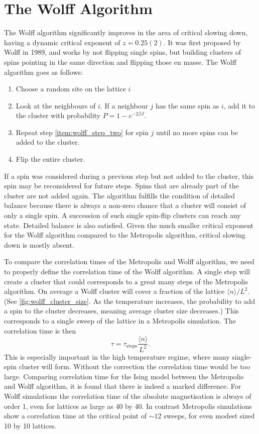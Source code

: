 \documentclass[11pt, a4paper]{report} %
\begin{document}
\section{The Wolff Algorithm}
The Wolff algorithm significantly improves in the area of critical slowing down, having a dynamic critical exponent of \(z=0.25(2)\)\cite{barkema:1991}.
It was first proposed by Wolff in 1989\cite{wolff:1989}, and works by not flipping single spins, but building clusters of spins pointing in the same direction and flipping those en masse.
The Wolff algorithm goes as follows\cite{landau:2015,newman:1999}:
\begin{enumerate}
	\item Choose a random site on the lattice \(i\)
	\item\label{item:wolff_step_two} Look at the neighbours of \(i\). If a neighbour \(j\) has the same spin as \(i\), add it to the cluster with probability \(P = 1 - e^{-2\beta J}\).
	\item Repeat step \ref{item:wolff_step_two} for spin \(j\) until no more spins can be added to the cluster.
	\item Flip the entire cluster.
\end{enumerate}
If a spin was considered during a previous step but not added to the cluster, this spin may be reconsidered for future steps.
Spins that are already part of the cluster are not added again.
The algorithm fulfills the condition of detailed balance because there is always a non-zero chance that a cluster will consist of only a single spin.
A succession of such single spin-flip clusters can reach any state. Detailed balance is also satisfied.
Given the much smaller critical exponent for the Wolff algorithm compared to the Metropolis algorithm, critical slowing down is mostly absent.

To compare the correlation times of the Metropolis and Wolff algorithm, we need to properly define the correlation time of the Wolff algorithm.
A single step will create a cluster that could corresponds to a great many steps of the Metropolis algorithm.
On average a Wolff cluster will cover a fraction of the lattice \(\langle n \rangle / L^2\). (See \cref{fig:wolff_cluster_size}. As the temperature increases, the probability to add a spin to the cluster decreases, meaning average cluster size decreases.)
This corresponds to a single sweep of the lattice in a Metropolis simulation.
The correlation time is then
\begin{equation}
	\tau = \tau_{\mathrm{steps}} \frac{\langle n \rangle}{L^2}.
\end{equation}
This is especially important in the high temperature regime, where many single-spin cluster will form.
Without the correction the correlation time would be too large.\cite{newman:1999}
Comparing correlation time for the Ising model between the Metropolis and Wolff algorithm, it is found that there is indeed a marked difference.
For Wolff simulations the correlation time of the absolute magnetisation is always of order 1, even for lattices as large as 40 by 40.
In contrast Metropolis simulations show a correlation time at the critical point of \(\sim 12\) sweeps, for even modest sized 10 by 10 lattices.
\end{document}
